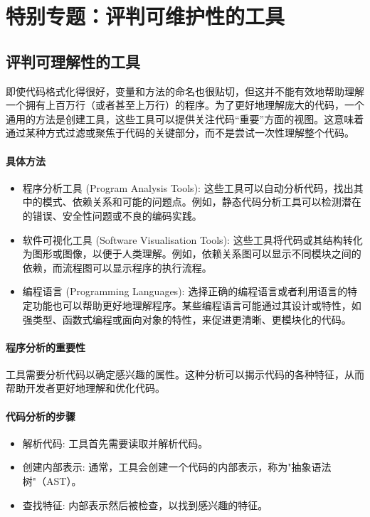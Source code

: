 \chapter{特别专题：评判可维护性的工具}

\section{评判可理解性的工具}

即使代码格式化得很好，变量和方法的命名也很贴切，但这并不能有效地帮助理解一个拥有上百万行（或者甚至上万行）的程序。为了更好地理解庞大的代码，一个通用的方法是创建工具，这些工具可以提供关注代码“重要”方面的视图。这意味着通过某种方式过滤或聚焦于代码的关键部分，而不是尝试一次性理解整个代码。

\subsubsection{具体方法}
\begin{itemize}
	\item 程序分析工具 (Program Analysis Tools): 这些工具可以自动分析代码，找出其中的模式、依赖关系和可能的问题点。例如，静态代码分析工具可以检测潜在的错误、安全性问题或不良的编码实践。
	\item 软件可视化工具 (Software Visualisation Tools): 这些工具将代码或其结构转化为图形或图像，以便于人类理解。例如，依赖关系图可以显示不同模块之间的依赖，而流程图可以显示程序的执行流程。
	\item 编程语言 (Programming Languages): 选择正确的编程语言或者利用语言的特定功能也可以帮助更好地理解程序。某些编程语言可能通过其设计或特性，如强类型、函数式编程或面向对象的特性，来促进更清晰、更模块化的代码。
\end{itemize}


\subsubsection{程序分析的重要性}
工具需要分析代码以确定感兴趣的属性。这种分析可以揭示代码的各种特征，从而帮助开发者更好地理解和优化代码。

\subsubsection{代码分析的步骤}
\begin{itemize}
	\item 解析代码: 工具首先需要读取并解析代码。
	\item 创建内部表示: 通常，工具会创建一个代码的内部表示，称为"抽象语法树"（AST）。
	\item 查找特征: 内部表示然后被检查，以找到感兴趣的特征。
\end{itemize}


